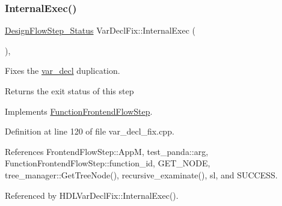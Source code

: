 \mbox{\label{classVarDeclFix_a41dbca562077d47c2d67bc7b7d2ef41d}} 
\subsubsection{\texorpdfstring{Internal\+Exec()}{InternalExec()}}
{\footnotesize\ttfamily \hyperlink{design__flow__step_8hpp_afb1f0d73069c26076b8d31dbc8ebecdf}{Design\+Flow\+Step\+\_\+\+Status} Var\+Decl\+Fix\+::\+Internal\+Exec (\begin{DoxyParamCaption}{ }\end{DoxyParamCaption})\hspace{0.3cm}{\ttfamily [override]}, {\ttfamily [virtual]}}



Fixes the \hyperlink{structvar__decl}{var\+\_\+decl} duplication. 

\begin{DoxyReturn}{Returns}
the exit status of this step 
\end{DoxyReturn}


Implements \hyperlink{classFunctionFrontendFlowStep_a00612f7fb9eabbbc8ee7e39d34e5ac68}{Function\+Frontend\+Flow\+Step}.



Definition at line 120 of file var\+\_\+decl\+\_\+fix.\+cpp.



References Frontend\+Flow\+Step\+::\+AppM, test\+\_\+panda\+::arg, Function\+Frontend\+Flow\+Step\+::function\+\_\+id, G\+E\+T\+\_\+\+N\+O\+DE, tree\+\_\+manager\+::\+Get\+Tree\+Node(), recursive\+\_\+examinate(), sl, and S\+U\+C\+C\+E\+SS.



Referenced by H\+D\+L\+Var\+Decl\+Fix\+::\+Internal\+Exec().

